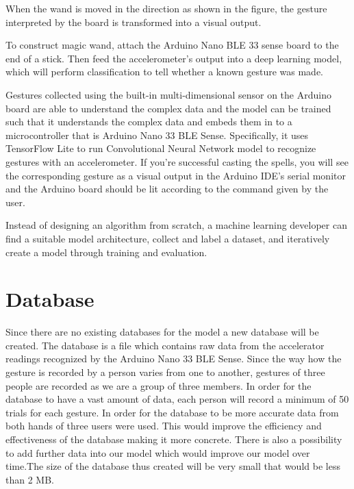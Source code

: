 When the wand is moved in the direction as shown in the figure, the gesture interpreted by the board is transformed into a visual output. 

To construct magic wand, attach the Arduino Nano BLE 33 sense board to the end of a stick. Then feed the accelerometer's output into a deep learning model, which will perform classification to tell whether a known gesture was made. \cite{Warden:2020}


Gestures collected using the built-in multi-dimensional sensor on the Arduino board are able to understand the complex data and the model can be trained such that it understands the complex data and embeds them in to a microcontroller that is Arduino Nano 33 BLE Sense. Specifically, it uses TensorFlow Lite  to run Convolutional Neural Network model to recognize gestures with an accelerometer.  If you're successful casting the spells, you will see the corresponding gesture as a visual output in the Arduino IDE's serial monitor and the Arduino board should be lit according to the command given by the user.



Instead of designing an algorithm from scratch, a machine learning developer can find a suitable model architecture, collect and label a dataset, and iteratively create a model through training and evaluation. \cite{Warden:2020}






\section{Database}

Since there are no existing databases for the model a new database will be created. The database is a file  which contains raw data from the accelerator  readings recognized by the Arduino Nano 33 BLE Sense. Since the way how the gesture is recorded by a person varies from one to another, gestures of three people are recorded as we are a group of three members. In order for the database to have a vast amount of data, each person will record a minimum of 50 trials for each gesture. In order for the database to be more accurate data from both hands of  three users were used. This would improve the efficiency and  effectiveness of the database making it more concrete. There is also a possibility to add further data into our model which would improve our model over time.The size of the database thus created will be very small that would be less than 2 MB. \cite{Warden:2020}

